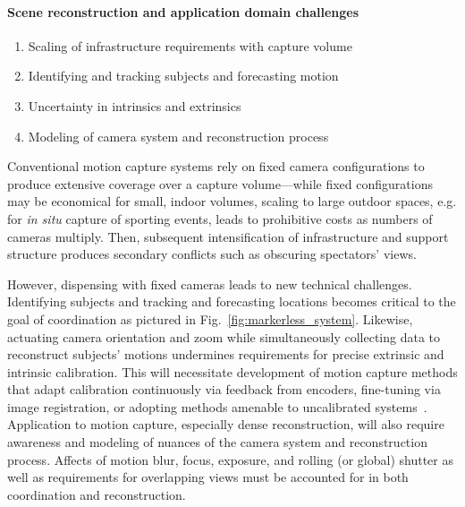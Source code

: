 \documentclass[11pt]{article}
\begin{document}
\paragraph{Scene reconstruction and application domain challenges}

\begin{enumerate}[itemsep=0.3ex,topsep=0.3ex]
  \item Scaling of infrastructure requirements with capture volume
  \item Identifying and tracking subjects and forecasting motion
  \item Uncertainty in intrinsics and extrinsics
  \item Modeling of camera system and reconstruction process
\end{enumerate}

Conventional motion
capture systems rely on fixed camera configurations to produce extensive
coverage over a capture volume---while fixed configurations may be
economical for small, indoor volumes, scaling to large outdoor spaces,
e.g. for \emph{in situ} capture of sporting events, leads to prohibitive costs
as numbers of cameras multiply.
Then, subsequent intensification of infrastructure and support structure
produces secondary conflicts such as obscuring spectators' views.

However, dispensing with fixed cameras
leads to new technical challenges.
Identifying subjects and tracking and forecasting locations becomes critical
to the goal of coordination as pictured in Fig.~\ref{fig:markerless_system}.
Likewise, actuating camera orientation and zoom while simultaneously collecting
data to reconstruct subjects' motions undermines requirements for precise
extrinsic and intrinsic calibration.
This will necessitate development of motion capture methods that adapt
calibration continuously via feedback from encoders,
fine-tuning via image registration, or adopting methods amenable to uncalibrated
systems~\citep{bachmann20193dv,xu2022bmvc}.
Application to motion capture, especially dense reconstruction, will also
require awareness and modeling of nuances of the camera system and
reconstruction process.
Affects of motion blur, focus, exposure, and rolling (or global) shutter as well
as requirements for overlapping views must be accounted for in both coordination
and reconstruction.
\end{document}
